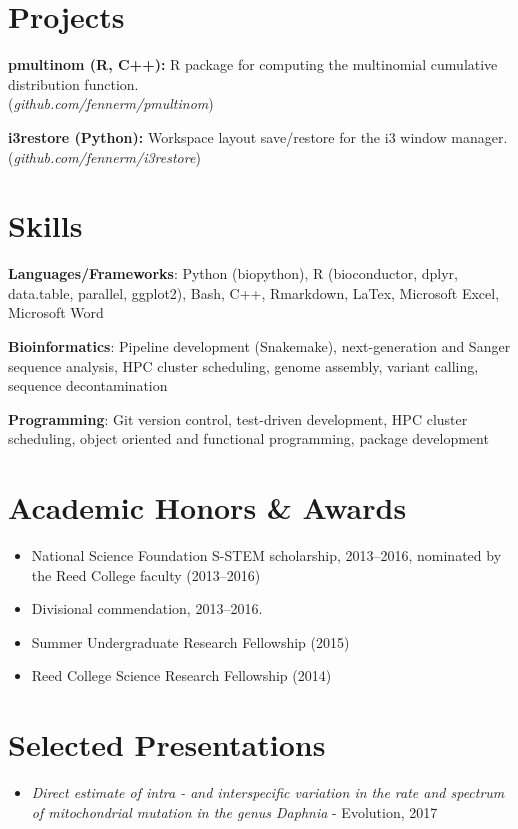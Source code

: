\documentclass {article}
\newenvironment{lItemize} {
   \begin{itemize}%
      \setlength{\itemsep}{0pt}%
      \setlength{\topsep}{0pt}
      \setlength{\partopsep}{0pt}
      \setlength{\parsep}{0pt}
      \setlength{\parskip}{0pt}%
      \vspace{2mm}
} {\end{itemize}}
\newcommand{\link}[1]{(\textit{#1})}
\newcommand{\project}[3]{\item \textbf{#1 (#2):} #3}
\newcommand{\skill}[2]{\item \textbf{#1}: #2}
\begin{document}
\section*{Projects}
\project{pmultinom}{R, C++} {R package for computing the multinomial
cumulative distribution function. \\\link{github.com/fennerm/pmultinom}}
\project{i3restore}{Python} {Workspace layout save/restore for the i3
window manager. \\\link{github.com/fennerm/i3restore}}

\section*{Skills}
\skill{Languages/Frameworks} {Python (biopython), R (bioconductor, dplyr,
data.table, parallel, ggplot2), Bash, C++, Rmarkdown, LaTex, Microsoft Excel, Microsoft Word}
\skill{Bioinformatics}{Pipeline development (Snakemake), next-generation
   and Sanger sequence analysis, HPC cluster scheduling, genome assembly,
variant calling, sequence decontamination}
\skill{Programming}{Git version control, test-driven development, HPC cluster
scheduling, object oriented and functional programming, package development}

\section*{Academic Honors \& Awards}
\begin{lItemize}
\item National Science Foundation S-STEM scholarship, 2013--2016, nominated
   by the Reed College faculty (2013--2016)
\item Divisional commendation, 2013--2016.
\item Summer Undergraduate Research Fellowship (2015)
\item Reed College Science Research Fellowship (2014)
\end{lItemize}

\section*{Selected Presentations}
\begin{lItemize}
\item{\textit{Direct estimate of intra - and interspecific variation in the
      rate and spectrum of mitochondrial mutation in the genus Daphnia}
   - Evolution, 2017}
\end{lItemize}
\end{document}
